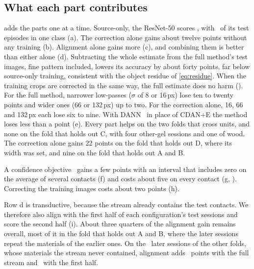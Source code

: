 \subsection{What each part contributes}
\label{sec:ablation}

 adds the parts one at a time. Source-only, the ResNet-50 scores \XpRecipeAcc\pct, with \XpRecipeTop\pct\ of its test episodes in one class (a). The correction alone gains about twelve points without any training (b). Alignment alone gains more (c), and combining them is better than either alone (d). Subtracting the whole estimate from the full method's test images, fine pattern included, lowers its accuracy by about forty points, far below source-only training, consistent with the object residue of \cref{eq:residue}. When the training crops are corrected in the same way, the full estimate does no harm (). For the full method, narrower low-passes ($\sigma$ of 8 or 16\,px) lose ten to twenty points and wider ones (66 or 132\,px) up to two. For the correction alone, 16, 66 and 132\,px each lose six to nine. With DANN~\cite{ganin2016dann} in place of CDAN+E the method loses less than a point (e). Every part helps on the two folds that cross units, and none on the fold that holds out C, with four other-gel sessions and one of wood. The correction alone gains 22 points on the fold that holds out D, where its width was set, and nine on the fold that holds out A and B.

A confidence objective~\cite{zhang2022memo,liang2020shot} gains a few points with an interval that includes zero on the average of several contacts (f) and costs about five on every contact (g, ). Correcting the training images costs about two points (h).

Row d is transductive, because the stream already contains the test contacts. We therefore also align with the first half of each configuration's test sessions and score the second half (i). About three quarters of the alignment gain remains overall, most of it in the fold that holds out A and B, where the later sessions repeat the materials of the earlier ones. On the \XpLateOtherN\ later sessions of the other folds, whose materials the stream never contained, alignment adds \XdLateOtherFull\ points with the full stream and \XdLateOtherEarly\ with the first half.

